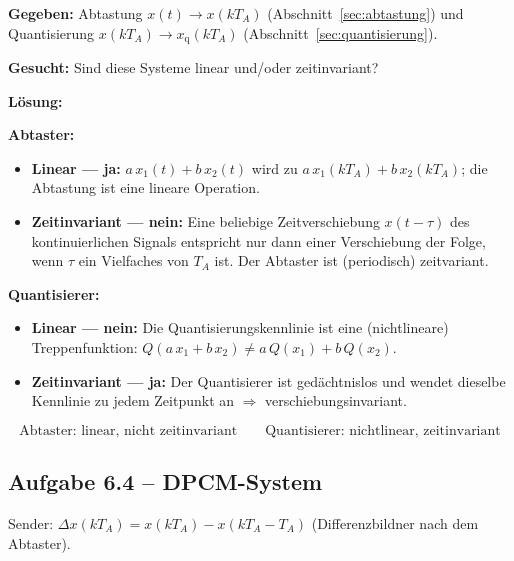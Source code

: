 \begin{beispiel}

\textbf{Gegeben:} Abtastung $x(t)\to x(kT_A)$
(Abschnitt~\ref{sec:abtastung}) und Quantisierung
$x(kT_A)\to x_{\mathrm q}(kT_A)$ (Abschnitt~\ref{sec:quantisierung}).

\textbf{Gesucht:} Sind diese Systeme linear und/oder zeitinvariant?

\textbf{Lösung:}

\textbf{Abtaster:}
\begin{itemize}
  \item \textbf{Linear — ja:} $a\,x_1(t)+b\,x_2(t)$ wird zu
        $a\,x_1(kT_A)+b\,x_2(kT_A)$; die Abtastung ist eine lineare Operation.
  \item \textbf{Zeitinvariant — nein:} Eine beliebige Zeitverschiebung
        $x(t-\tau)$ des kontinuierlichen Signals entspricht nur dann einer
        Verschiebung der Folge, wenn $\tau$ ein Vielfaches von $T_A$ ist.
        Der Abtaster ist (periodisch) zeitvariant.
\end{itemize}

\textbf{Quantisierer:}
\begin{itemize}
  \item \textbf{Linear — nein:} Die Quantisierungskennlinie ist eine
        (nichtlineare) Treppenfunktion:
        $Q(a\,x_1+b\,x_2)\neq a\,Q(x_1)+b\,Q(x_2)$.
  \item \textbf{Zeitinvariant — ja:} Der Quantisierer ist gedächtnislos und
        wendet dieselbe Kennlinie zu jedem Zeitpunkt an
        $\Rightarrow$ verschiebungsinvariant.
\end{itemize}

$$
\boxed{\text{Abtaster: linear, nicht zeitinvariant}\qquad
        \text{Quantisierer: nichtlinear, zeitinvariant}}
$$

\end{beispiel}

\subsection*{Aufgabe 6.4 – DPCM-System}

Sender: $\Delta x(kT_A)=x(kT_A)-x(kT_A-T_A)$ (Differenzbildner nach dem
Abtaster).

